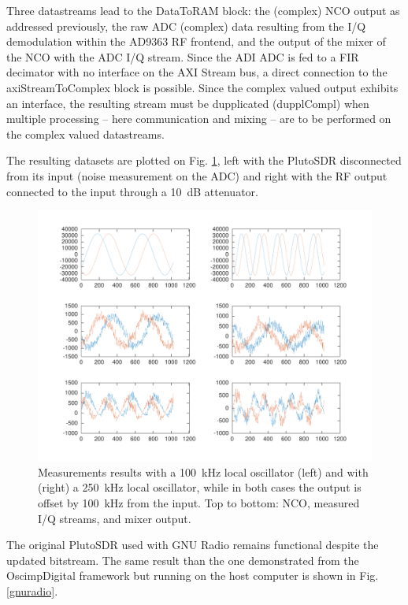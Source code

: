 \documentclass{article}
\begin{document}
Three datastreams lead to the DataToRAM block: the (complex) NCO output as addressed 
previously, the raw ADC (complex) data resulting from the I/Q demodulation within 
the AD9363 RF frontend, and the output of the mixer of the NCO with the ADC I/Q stream.
Since the ADI ADC is fed to a FIR decimator with no interface on the AXI Stream bus,
a direct connection to the axiStreamToComplex block is possible. Since the complex
valued output exhibits an interface, the resulting stream must be dupplicated 
(dupplCompl) when multiple processing -- here communication and mixing -- are to be
performed on the complex valued datastreams.

The resulting datasets are plotted on Fig. \ref{openclosed}, left with the
PlutoSDR disconnected from its input (noise measurement on the ADC) and right with
the RF output connected to the input through a 10~dB attenuator.

\begin{figure}[h!tb]
\includegraphics[width=\linewidth]{100kHz_250kHz}
\caption{Measurements results with a 100~kHz local oscillator (left) and with (right) a
250~kHz local oscillator, while in both cases the output is offset by 100~kHz from the
input. Top to bottom: NCO, measured I/Q streams, and mixer output.}
\label{openclosed}
\end{figure}

The original PlutoSDR used with GNU Radio remains functional despite the updated bitstream.
The same result than the one demonstrated from the OscimpDigital framework but running on the
host computer is shown in Fig. \ref{gnuradio}.
\end{document}
